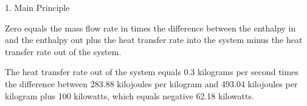 1. Main Principle

Zero equals the mass flow rate in times the difference between the enthalpy in and the enthalpy out plus the heat transfer rate into the system minus the heat transfer rate out of the system.

The heat transfer rate out of the system equals 0.3 kilograms per second times the difference between 283.88 kilojoules per kilogram and 493.04 kilojoules per kilogram plus 100 kilowatts, which equals negative 62.18 kilowatts.